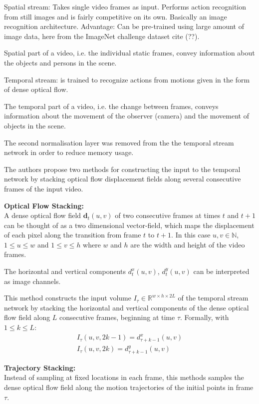 Spatial stream: Takes single video frames as input. Performs action recognition from still images and is fairly competitive on its own. Basically an image recognition architecture. Advantage: Can be pre-trained using large amount of image data, here from the ImageNet challenge dataset cite (??).

Spatial part of a video, i.e. the individual static frames, convey information about the objects and persons in the scene.

Temporal stream: is trained to recognize actions from motions given in the form of dense optical flow.

The temporal part of a video, i.e. the change between frames, conveys information about the movement of the observer (camera) and the movement of objects in the scene.

The second normalisation layer was removed from the the temporal stream network in order to reduce memory usage.

The authors propose two methods for constructing the input to the temporal network by stacking optical flow displacement fields along several consecutive frames of the input video.

\textbf{Optical Flow Stacking:} \\
A dense optical flow field $\mathbf{d}_t(u,v)$ of two consecutive frames at times $t$ and $t+1$ can be thought of as a two dimensional vector-field, which maps the displacement of each pixel along the transition from frame $t$ to $t+1$. In this case $u,v \in \mathbb{N}$, $1 \leq u \leq w$ and $1 \leq v \leq h$ where $w$ and $h$ are the width and height of the video frames.

The horizontal and vertical components $d_t^x(u,v)$, $d_t^y(u,v)$ can be interpreted as image channels.

This method constructs the input volume $I_\tau \in \mathbb{R}^{w \times h \times 2L}$ of the temporal stream network by stacking the horizontal and vertical components of the dense optical flow field along $L$ consecutive frames, beginning at time $\tau$. Formally, with $1 \leq k \leq L$:
\begin{align*}
    I_\tau(u,v,2k-1) = d_{\tau + k - 1}^x(u,v) \\
    I_\tau(u,v,2k) = d_{\tau + k - 1}^{y}(u,v)
\end{align*}

\textbf{Trajectory Stacking:} \\
Instead of sampling at fixed locations in each frame, this methods samples the dense optical flow field along the motion trajectories of the initial points in frame $\tau$.

